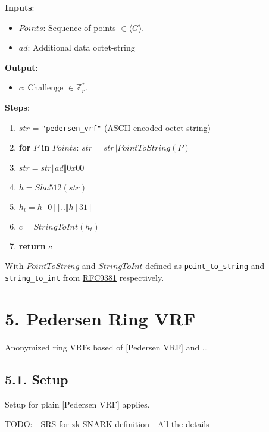 \documentclass[
]{article}
\providecommand{\tightlist}{%
  \setlength{\itemsep}{0pt}\setlength{\parskip}{0pt}}
\begin{document}
\textbf{Inputs}:

\begin{itemize}
\tightlist
\item
  \(Points\): Sequence of points \(\in \langle G \rangle\).
\item
  \(ad\): Additional data octet-string
\end{itemize}

\textbf{Output}:

\begin{itemize}
\tightlist
\item
  \(c\): Challenge \(\in \mathbb{Z}^*_r\).
\end{itemize}

\textbf{Steps}:

\begin{enumerate}
\def\labelenumi{\arabic{enumi}.}
\tightlist
\item
  \(str\) = \texttt{"pedersen\_vrf"} (ASCII encoded octet-string)
\item
  \textbf{for} \(P\) \textbf{in} \(Points\):
  \(str = str \Vert PointToString(P)\)
\item
  \(str = str \Vert ad \Vert 0x00\)
\item
  \(h = Sha512(str)\)
\item
  \(h_t = h[0] \Vert .. \Vert h[31]\)
\item
  \(c = StringToInt(h_t)\)
\item
  \textbf{return} \(c\)
\end{enumerate}

With \(PointToString\) and \(StringToInt\) defined as
\texttt{point\_to\_string} and \texttt{string\_to\_int} from
\href{https://datatracker.ietf.org/doc/rfc9381}{RFC9381} respectively.

\hypertarget{pedersen-ring-vrf}{%
\section{5. Pedersen Ring VRF}\label{pedersen-ring-vrf}}

Anonymized ring VRFs based of {[}Pedersen VRF{]} and \ldots{}

\hypertarget{setup-2}{%
\subsection{5.1. Setup}\label{setup-2}}

Setup for plain {[}Pedersen VRF{]} applies.

TODO: - SRS for zk-SNARK definition - All the details
\end{document}

